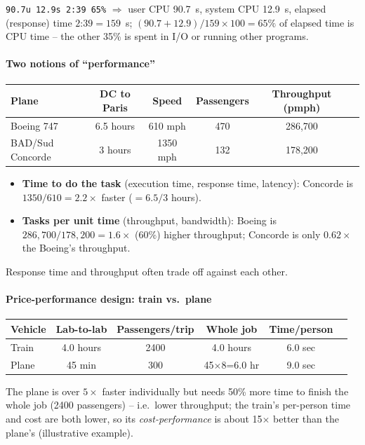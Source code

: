 \begin{eg}
\texttt{90.7u 12.9s 2:39 65\%} $\Rightarrow$ user CPU 90.7~s, system CPU
12.9~s, elapsed (response) time $2$:$39 = 159$~s; $(90.7+12.9)/159 \times
100 = 65\%$ of elapsed time is CPU time -- the other 35\% is spent in I/O or
running other programs.
\end{eg}

\paragraph{Two notions of ``performance''}
\begin{eg}
\leavevmode
\begin{center}
\begin{tabular}{@{}lccccc@{}}
\toprule
Plane & DC to Paris & Speed & Passengers & Throughput (pmph) \\
\midrule
Boeing 747      & 6.5 hours & 610 mph  & 470 & 286,700 \\
BAD/Sud Concorde & 3 hours  & 1350 mph & 132 & 178,200 \\
\bottomrule
\end{tabular}
\end{center}
\begin{itemize}
  \item \textbf{Time to do the task} (execution time, response time,
  latency): Concorde is $1350/610 = 2.2\times$ faster ($=6.5/3$ hours).
  \item \textbf{Tasks per unit time} (throughput, bandwidth): Boeing is
  $286{,}700/178{,}200 = 1.6\times$ ($60\%$) higher throughput; Concorde is
  only $0.62\times$ the Boeing's throughput.
\end{itemize}
\end{eg}
\begin{remark}
Response time and throughput often trade off against each other.
\end{remark}

\paragraph{Price-performance design: train vs.\ plane}
\begin{eg}
\leavevmode
\begin{center}
\small
\begin{tabular}{@{}lccccc@{}}
\toprule
Vehicle & Lab-to-lab & Passengers/trip & Whole job &
Time/person \\
\midrule
Train & 4.0 hours & 2400 & 4.0 hours    & 6.0 sec \\
Plane & 45 min    & 300  & 45$\times$8=6.0 hr & 9.0 sec \\
\bottomrule
\end{tabular}
\end{center}
The plane is over $5\times$ faster individually but needs 50\% more time to
finish the whole job (2400 passengers) -- i.e.\ lower throughput; the
train's per-person time and cost are both lower, so its \emph{cost-performance}
is about 15$\times$ better than the plane's (illustrative example).
\end{eg}

